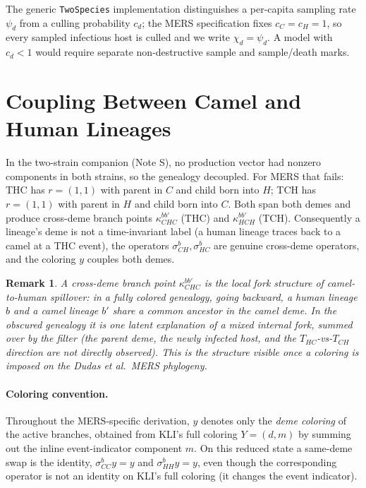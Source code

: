 \documentclass[11pt]{article}
\theoremstyle{plain}
\newtheorem{remark}{Remark}[section]
\begin{document}
The generic \texttt{TwoSpecies} implementation distinguishes a per-capita sampling rate $\psi_d$
from a culling probability $c_d$; the MERS specification fixes $c_C=c_H=1$, so every sampled
infectious host is culled and we write $\chi_d=\psi_d$. A model with $c_d<1$ would require
separate non-destructive sample and sample/death marks.

\section{Coupling Between Camel and Human Lineages}
In the two-strain companion (Note S), no production vector had nonzero components in both strains,
so the genealogy decoupled. For MERS that fails: THC has $r=(1,1)$ with parent in $C$ and child
born into $H$; TCH has $r=(1,1)$ with parent in $H$ and child born into $C$. Both span both demes
and produce cross-deme branch points $\kappa^{bb'}_{CHC}$ (THC) and $\kappa^{bb'}_{HCH}$ (TCH).
Consequently a lineage's deme is not a time-invariant label (a human lineage traces back to a camel
at a THC event), the operators $\sigma^b_{CH},\sigma^b_{HC}$ are genuine cross-deme operators, and
the coloring $y$ couples both demes.

\begin{remark}
A cross-deme branch point $\kappa^{bb'}_{CHC}$ is the local fork structure of camel-to-human
spillover: in a \emph{fully colored} genealogy, going backward, a human lineage $b$ and a camel lineage
$b'$ share a common ancestor in the camel deme. In the \emph{obscured} genealogy it is one latent
explanation of a mixed internal fork, summed over by the filter (the parent deme, the newly infected
host, and the $T_{HC}$-vs-$T_{CH}$ direction are not directly observed). This is the structure
visible once a coloring is imposed on the Dudas et al.\ MERS phylogeny.
\end{remark}

\paragraph{Coloring convention.} Throughout the MERS-specific derivation, $y$ denotes only the
\emph{deme coloring} of the active branches, obtained from KLI's full coloring $Y=(d,m)$ by
summing out the inline event-indicator component $m$. On this reduced state a same-deme swap is
the identity, $\sigma^b_{CC}y=y$ and $\sigma^b_{HH}y=y$, even though the corresponding operator
is not an identity on KLI's full coloring (it changes the event indicator).
\end{document}
